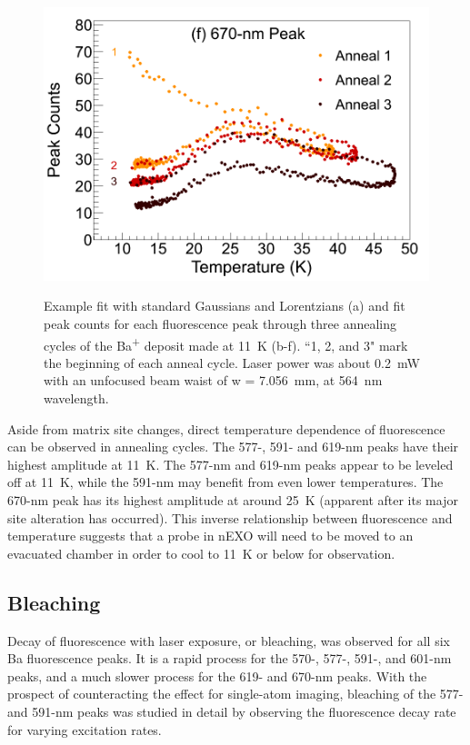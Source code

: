 \begin{figure}
                ~
                \includegraphics[width=.5\textwidth]{figures/anneal_670peak.png}
                \caption{Example fit with standard Gaussians and Lorentzians (a) and fit peak counts for each fluorescence peak through three annealing cycles of the Ba\textsuperscript{+} deposit made at 11~K (b-f).  ``1, 2, and 3" mark the beginning of each anneal cycle.  Laser power was about 0.2~mW with an unfocused beam waist of w = 7.056~mm, at 564~nm wavelength.}
\label{fig:annealGrn}
\end{figure}

Aside from matrix site changes, direct temperature dependence of fluorescence can be observed in annealing cycles.  The 577-, 591- and 619-nm peaks have their highest amplitude at 11~K.  The 577-nm and 619-nm peaks appear to be leveled off at 11~K, while the 591-nm may benefit from even lower temperatures.  The 670-nm peak has its highest amplitude at around 25~K (apparent after its major site alteration has occurred).  This inverse relationship between fluorescence and temperature suggests that a probe in nEXO will need to be moved to an evacuated chamber in order to cool to 11~K or below for observation.  



\subsection{Bleaching}
\label{subsec:bleaching}

Decay of fluorescence with laser exposure, or bleaching, was observed for all six Ba fluorescence peaks.  It is a rapid process for the 570-, 577-, 591-, and 601-nm peaks, and a much slower process for the 619- and 670-nm peaks.  With the prospect of counteracting the effect for single-atom imaging, bleaching of the 577- and 591-nm peaks was studied in detail by observing the fluorescence decay rate for varying excitation rates.  

